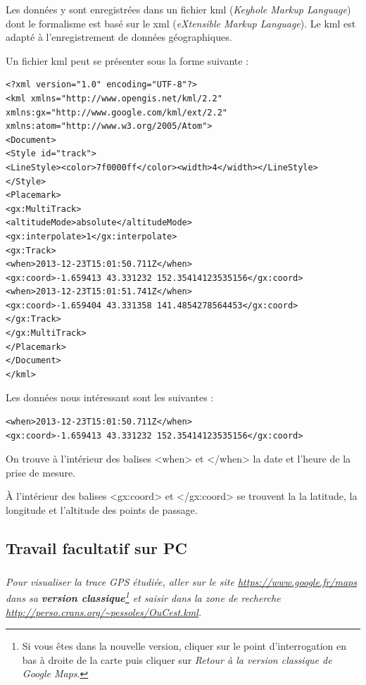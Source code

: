 \documentclass[10pt,oneside]{article}
\begin{document}
Les données y sont enregistrées dans un fichier \textsf{kml} (\textit{Keyhole Markup Language}) dont le formalisme est basé sur le \textsf{xml} (\textit{eXtensible Markup Language}). Le \textsf{kml}  est adapté à l'enregistrement de données géographiques. 

\begin{exemple}
Un fichier \textsf{kml} peut se présenter sous la forme suivante : 

\footnotesize
\begin{verbatim}
<?xml version="1.0" encoding="UTF-8"?>
<kml xmlns="http://www.opengis.net/kml/2.2"
xmlns:gx="http://www.google.com/kml/ext/2.2"
xmlns:atom="http://www.w3.org/2005/Atom">
<Document>
<Style id="track">
<LineStyle><color>7f0000ff</color><width>4</width></LineStyle>
</Style>
<Placemark>
<gx:MultiTrack>
<altitudeMode>absolute</altitudeMode>
<gx:interpolate>1</gx:interpolate>
<gx:Track>
<when>2013-12-23T15:01:50.711Z</when>
<gx:coord>-1.659413 43.331232 152.35414123535156</gx:coord>
<when>2013-12-23T15:01:51.741Z</when>
<gx:coord>-1.659404 43.331358 141.4854278564453</gx:coord>
</gx:Track>
</gx:MultiTrack>
</Placemark>
</Document>
</kml>
\end{verbatim}

\normalsize

Les données nous intéressant sont les suivantes :
\begin{verbatim}
<when>2013-12-23T15:01:50.711Z</when>
<gx:coord>-1.659413 43.331232 152.35414123535156</gx:coord>
\end{verbatim}

On trouve à l'intérieur des balises \textsf{<when>} et \textsf{</when>} la date et l'heure de la prise de mesure.

\`A l'intérieur des balises \textsf{<gx:coord>} et \textsf{</gx:coord>} se trouvent la la latitude, la longitude et l'altitude des points de passage. 


\end{exemple}


\subsection{Travail facultatif sur PC}

\subparagraph{}
\textit{Pour visualiser la trace GPS étudiée, aller sur le site  \url{https://www.google.fr/maps} dans sa \textbf{version classique}\footnote{Si vous êtes dans la nouvelle version, cliquer sur le point d'interrogation en bas à droite de la carte puis cliquer sur \textit{Retour à la version classique de Google Maps}.} et saisir dans la zone de recherche \url{http://perso.crans.org/~pessoles/OuCest.kml}.}
\end{document}
